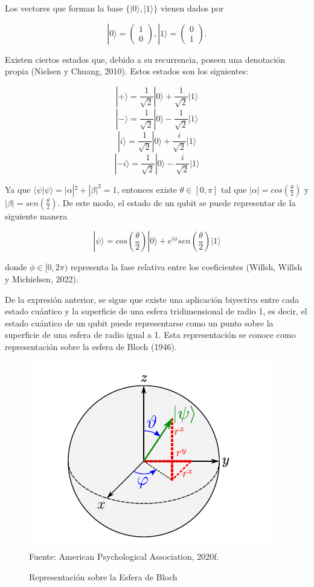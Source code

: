 Los vectores que forman la base $\{ |0 \rangle , |1 \rangle  \}$ vienen dados por

$$ |0 \rangle = \begin{pmatrix} 1\\ 0 \end{pmatrix}, |1 \rangle = \begin{pmatrix} 0\\ 1 \end{pmatrix}.$$

Existen ciertos estados que, debido a su recurrencia, poseen una denotación propia (Nielsen y Chuang, 2010). Estos estados son los siguientes:

$$ | + \rangle = \frac{1}{\sqrt{2}} | 0 \rangle + \frac{1}{\sqrt{2}} | 1 \rangle $$
$$ | - \rangle = \frac{1}{\sqrt{2}} | 0 \rangle - \frac{1}{\sqrt{2}} | 1 \rangle $$
$$ | i \rangle = \frac{1}{\sqrt{2}} | 0 \rangle + \frac{i}{\sqrt{2}} | 1 \rangle $$
$$ | -i \rangle = \frac{1}{\sqrt{2}} | 0 \rangle - \frac{i}{\sqrt{2}} | 1 \rangle $$

Ya que $ \langle \psi | \psi \rangle = | \alpha |^2 + | \beta |^2=1$, entonces existe $ \theta \in [0, \pi]$ tal que $ | \alpha | = cos ( \frac{\theta}{2} )$ y $ | \beta | = sen ( \frac{\theta}{2} )$. De este modo, el estado de un qubit se puede representar de la siguiente manera

$$ | \psi \rangle = cos ( \frac{\theta}{2}) | 0 \rangle + e^{i \phi} sen ( \frac{\theta}{2} ) | 1 \rangle  $$

donde $\phi \in [0 , 2 \pi)$ representa la fase relativa entre los coeficientes (Willsh, Willsh y Michielsen, 2022).

De la expresión anterior, se sigue que existe una aplicación biyectiva entre cada estado cuántico y la superficie de una esfera tridimensional de radio 1, es decir, el estado cuántico de un qubit puede representarse como un punto sobre la superficie de una esfera de radio igual a 1. Esta representación se conoce como representación sobre la esfera de Bloch (1946).



\begin{figure}[ht]
	\begin{center}
		\caption{Representación sobre la Esfera de Bloch}
		\label{fig:fig-1}
		\includegraphics[width=0.5\linewidth]{Bloch.PNG}
		\small Fuente: American Psychological Association, 2020f.
	\end{center}
\end{figure}

